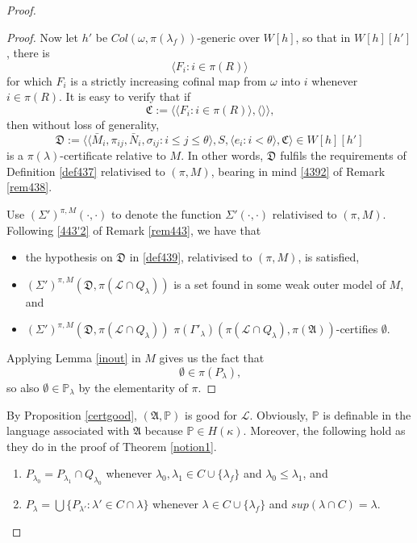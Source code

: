 \documentclass[12pt]{article}
\numberwithin{equation}{section}
\begin{document}
\begin{proof}
\begin{proof}
Now let $h'$ be $Col(\omega, \pi(\lambda_f))$-generic over $W[h]$, so that in $W[h][h']$, there is 
\begin{equation*}
    \langle F_i : i \in \pi(R) \rangle
\end{equation*}
for which $F_i$ is a strictly increasing cofinal map from $\omega$ into $i$ whenever $i \in \pi(R)$. It is easy to verify that if
\begin{equation*}
    \mathfrak{C} := \langle \langle F_i : i \in \pi(R) \rangle, \langle \rangle \rangle \text{,}
\end{equation*}
then without loss of generality,
\begin{equation*}
    \mathfrak{D} := \langle \langle \bar{M}_i, \pi_{ij},  \bar{N}_i, \sigma_{ij} : i \leq j \leq \theta \rangle, S, \langle e_i : i < \theta \rangle, \mathfrak{C} \rangle \in W[h][h']
\end{equation*}
is a $\pi(\lambda)$-certificate relative to $M$. In other words, $\mathfrak{D}$ fulfils the requirements of Definition \ref{def437} relativised to $(\pi, M)$, bearing in mind \ref{4392} of Remark \ref{rem438}. 

Use $(\Sigma')^{\pi, M}(\cdot, \cdot)$ to denote the function $\Sigma'(\cdot, \cdot)$ relativised to $(\pi, M)$. Following \ref{443'2} of Remark \ref{rem443}, we have that
\begin{itemize}
    \item the hypothesis on $\mathfrak{D}$ in \ref{def439}, relativised to $(\pi, M)$, is satisfied, 
    \item $(\Sigma')^{\pi, M}(\mathfrak{D}, \pi(\mathcal{L} \cap Q_{\lambda}))$ is a set found in some weak outer model of $M$, and
    \item $(\Sigma')^{\pi, M}(\mathfrak{D}, \pi(\mathcal{L} \cap Q_{\lambda}))$ $\pi(\Gamma'_{\lambda}) (\pi(\mathcal{L} \cap Q_{\lambda}), \pi(\mathfrak{A}))$-certifies $\emptyset$. 
\end{itemize}
Applying Lemma \ref{inout} in $M$ gives us the fact that 
\begin{equation*}
    \emptyset \in \pi(P_{\lambda}) \text{,}
\end{equation*}
so also $\emptyset \in \mathbb{P}_{\lambda}$ by the elementarity of $\pi$. 
\end{proof}

By Proposition \ref{certgood}, $(\mathfrak{A}, \mathbb{P})$ is good for $\mathcal{L}$. Obviously, $\mathbb{P}$ is definable in the language associated with $\mathfrak{A}$ because $\mathbb{P} \in H(\kappa)$. Moreover, the following hold as they do in the proof of Theorem \ref{notion1}.
\begin{enumerate}[label=(P\arabic*), leftmargin=40pt]
    \item\label{p1'} $P_{\lambda_0} = P_{\lambda_1} \cap Q_{\lambda_0}$ whenever $\lambda_0, \lambda_1 \in C \cup \{\lambda_f\}$ and $\lambda_0 \leq \lambda_1$, and
    \item\label{p2'} $P_{\lambda} = \bigcup \{P_{\lambda'} : \lambda' \in C \cap \lambda\}$ whenever $\lambda \in C \cup \{\lambda_f\}$ and $sup(\lambda \cap C) = \lambda$.
\end{enumerate}


\end{proof}
\end{document}
